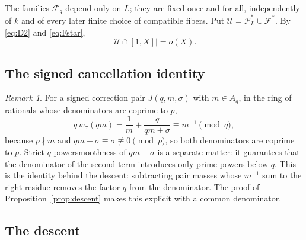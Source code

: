 \documentclass[11pt,letterpaper]{article}
\numberwithin{equation}{section}
\theoremstyle{plain}
\theoremstyle{remark}
\newtheorem{remark}{Remark}
\newcommand{\cP}{\mathcal P}
\newcommand{\cF}{\mathcal F}
\newcommand{\cU}{\mathcal U}
\begin{document}
The families $\cF_q$ depend only on $L$; they are fixed once and for all, independently of $k$ and of every later finite choice of compatible fibers. Put $\cU=\cP^*_L\cup\cF^*$. By \eqref{eq:D2} and \eqref{eq:Fstar},
\begin{equation}\label{eq:D3}
|\cU\cap[1,X]|=o(X).
\end{equation}

\subsection{The signed cancellation identity}\label{sec:cancel}

\begin{remark}\label{rem:cancel}
For a signed correction pair $J(q,m,\sigma)$ with $m\in A_q$, in the ring of rationals whose denominators are coprime to $p$,
\begin{equation}\label{eq:D4}
q\,w_\sigma(qm)=\frac1m+\frac q{qm+\sigma}\equiv m^{-1}\pmod q,
\end{equation}
because $p\nmid m$ and $qm+\sigma\equiv\sigma\not\equiv0\pmod p$, so both denominators are coprime to $p$. Strict $q$-powersmoothness of $qm+\sigma$ is a separate matter: it guarantees that the denominator of the second term introduces only prime powers below $q$. This is the identity behind the descent: subtracting pair masses whose $m^{-1}$ sum to the right residue removes the factor $q$ from the denominator. The proof of Proposition~\ref{prop:descent} makes this explicit with a common denominator.
\end{remark}

\subsection{The descent}\label{sec:descentprop}
\end{document}

